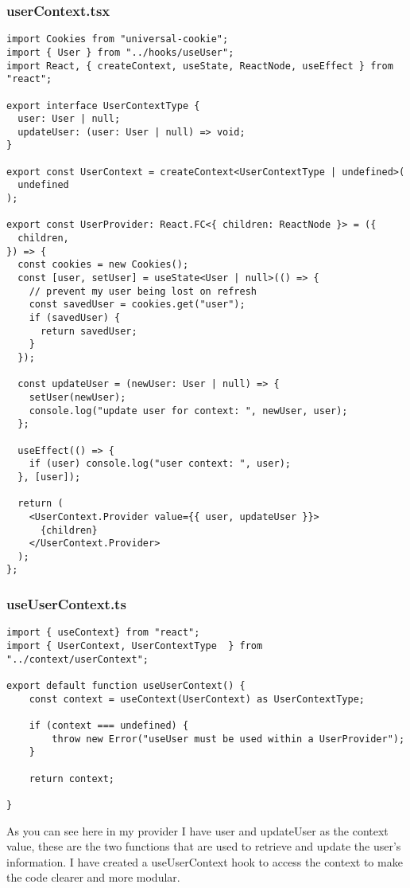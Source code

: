 \subsubsection{userContext.tsx}
\begin{verbatim}
import Cookies from "universal-cookie";
import { User } from "../hooks/useUser";
import React, { createContext, useState, ReactNode, useEffect } from "react";

export interface UserContextType {
  user: User | null;
  updateUser: (user: User | null) => void;
}

export const UserContext = createContext<UserContextType | undefined>(
  undefined
);

export const UserProvider: React.FC<{ children: ReactNode }> = ({
  children,
}) => {
  const cookies = new Cookies();
  const [user, setUser] = useState<User | null>(() => {
    // prevent my user being lost on refresh
    const savedUser = cookies.get("user");
    if (savedUser) {
      return savedUser;
    }
  });

  const updateUser = (newUser: User | null) => {
    setUser(newUser);
    console.log("update user for context: ", newUser, user);
  };

  useEffect(() => {
    if (user) console.log("user context: ", user);
  }, [user]);

  return (
    <UserContext.Provider value={{ user, updateUser }}>
      {children}
    </UserContext.Provider>
  );
};
\end{verbatim}


\subsubsection{useUserContext.ts}
\begin{verbatim}
import { useContext} from "react";
import { UserContext, UserContextType  } from "../context/userContext";

export default function useUserContext() {
    const context = useContext(UserContext) as UserContextType;

    if (context === undefined) {
        throw new Error("useUser must be used within a UserProvider");
    }

    return context;

}
\end{verbatim}

As you can see here in my provider I have user and updateUser as the context value, these are the two functions that are used to retrieve and update the user's information. I have created a useUserContext hook to access the context to make the code clearer and more modular.


